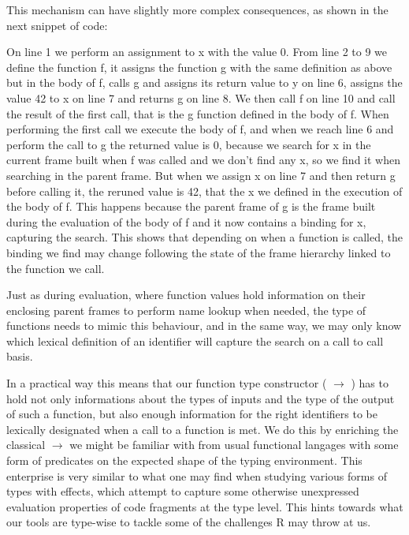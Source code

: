 This mechanism can have slightly more complex consequences, as shown in the next snippet of code:



On line 1 we perform an assignment to x with the value 0. From line 2 to 9 we define the function f, it assigns the function g with the same definition as above but in the body of f, calls g and assigns its return value to y on line 6, assigns the value 42 to x on line 7 and returns g on line 8.
We then call f on line 10 and call the result of the first call, that is the g function defined in the body of f.
When performing the first call we execute the body of f, and when we reach line 6 and perform the call to g the returned value is 0, because we search for x in the current frame built when f was called and we don't find any x, so we find it when searching in the parent frame. But when we assign x on line 7 and then return g before calling it, the reruned value is 42, that the x we defined in the execution of the body of f. This happens because the parent frame of g is the frame built during the evaluation of the body of f and it now contains a binding for x, capturing the search. This shows that depending on when a function is called, the binding we find may change following the state of the frame hierarchy linked to the function we call.

Just as during evaluation, where function values hold information on their enclosing parent frames to perform name lookup when needed, the type of functions needs to mimic this behaviour, and in the same way, we may only know which lexical definition of an identifier will capture the search on a call to call basis.

In a practical way this means that our function type constructor ( $\rightarrow$ ) has to hold not only informations about the types of inputs and the type of the output of such a function, but also enough information for the right identifiers to be lexically designated when a call to a function is met. We do this by enriching the classical $\rightarrow$ we might be familiar with from usual functional langages with some form of predicates on the expected shape of the typing environment. This enterprise is very similar to what one may find when studying various forms of types with effects, which attempt to capture some otherwise unexpressed evaluation properties of code fragments at the type level. This hints towards what our tools are type-wise to tackle some of the challenges R may throw at us.

